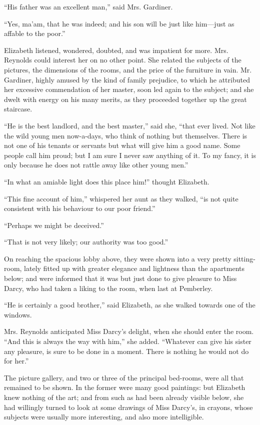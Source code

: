 \documentclass[12pt,openright]{book}
\begin{document}
“His father was an excellent man,” said Mrs. Gardiner.

“Yes, ma’am, that he was indeed; and his son will be just like him—just as affable to the poor.”

Elizabeth listened, wondered, doubted, and was impatient for more. Mrs. Reynolds could interest her on no other point. She related the subjects of the pictures, the dimensions of the rooms, and the price of the furniture in vain. Mr. Gardiner, highly amused by the kind of family prejudice, to which he attributed her excessive commendation of her master, soon led again to the subject; and she dwelt with energy on his many merits, as they proceeded together up the great staircase.

“He is the best landlord, and the best master,” said she, “that ever lived. Not like the wild young men now-a-days, who think of nothing but themselves. There is not one of his tenants or servants but what will give him a good name. Some people call him proud; but I am sure I never saw anything of it. To my fancy, it is only because he does not rattle away like other young men.”

“In what an amiable light does this place him!” thought Elizabeth.

“This fine account of him,” whispered her aunt as they walked, “is not quite consistent with his behaviour to our poor friend.”

“Perhaps we might be deceived.”

“That is not very likely; our authority was too good.”

On reaching the spacious lobby above, they were shown into a very pretty sitting-room, lately fitted up with greater elegance and lightness than the apartments below; and were informed that it was but just done to give pleasure to Miss Darcy, who had taken a liking to the room, when last at Pemberley.

“He is certainly a good brother,” said Elizabeth, as she walked towards one of the windows.

Mrs. Reynolds anticipated Miss Darcy’s delight, when she should enter the room. “And this is always the way with him,” she added. “Whatever can give his sister any pleasure, is sure to be done in a moment. There is nothing he would not do for her.”

The picture gallery, and two or three of the principal bed-rooms, were all that remained to be shown. In the former were many good paintings: but Elizabeth knew nothing of the art; and from such as had been already visible below, she had willingly turned to look at some drawings of Miss Darcy’s, in crayons, whose subjects were usually more interesting, and also more intelligible.
\end{document}
